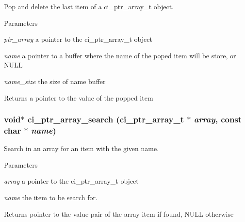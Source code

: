 Pop and delete the last item of a ci\_\-ptr\_\-array\_\-t object. 
\begin{DoxyParams}{Parameters}
\item[{\em ptr\_\-array}]a pointer to the ci\_\-ptr\_\-array\_\-t object \item[{\em name}]a pointer to a buffer where the name of the poped item will be store, or NULL \item[{\em name\_\-size}]the size of name buffer \end{DoxyParams}
\begin{DoxyReturn}{Returns}
a pointer to the value of the popped item 
\end{DoxyReturn}
\hypertarget{group__PTR__ARRAYS_ga0f704014af3083ddc87184a32f899467}{
\subsubsection[{ci\_\-ptr\_\-array\_\-search}]{\setlength{\rightskip}{0pt plus 5cm}void$\ast$ ci\_\-ptr\_\-array\_\-search ({\bf ci\_\-ptr\_\-array\_\-t} $\ast$ {\em array}, \/  const char $\ast$ {\em name})}}
\label{group__PTR__ARRAYS_ga0f704014af3083ddc87184a32f899467}


Search in an array for an item with the given name. 
\begin{DoxyParams}{Parameters}
\item[{\em array}]a pointer to the ci\_\-ptr\_\-array\_\-t object \item[{\em name}]the item to be search for. \end{DoxyParams}
\begin{DoxyReturn}{Returns}
pointer to the value pair of the array item if found, NULL otherwise 
\end{DoxyReturn}
